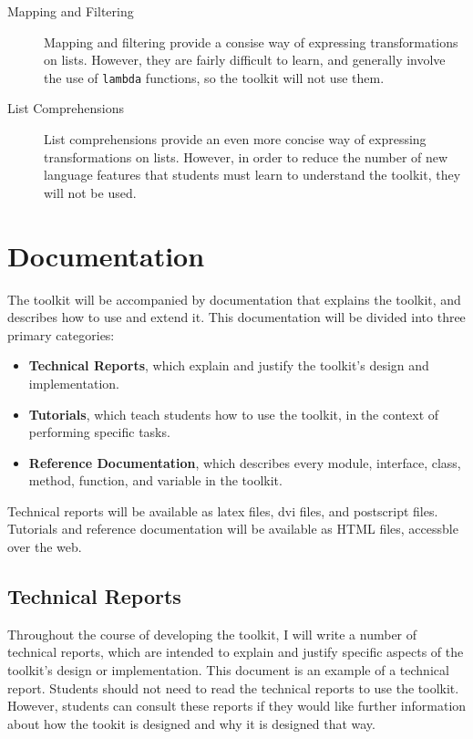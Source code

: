 \documentclass{article}
\begin{document}
\begin{description}
  \item[Mapping and Filtering] Mapping and filtering provide a
  consise way of expressing transformations on lists.  However, they
  are fairly difficult to learn, and generally involve the use of
  \texttt{lambda} functions, so the toolkit will not use them.

  \item[List Comprehensions] List comprehensions provide an even more
  concise way of expressing transformations on lists.  However, in
  order to reduce the number of new language features that students
  must learn to understand the toolkit, they will not be used.

\end{description}

\section{Documentation}

The toolkit will be accompanied by documentation that explains the
toolkit, and describes how to use and extend it.  This documentation
will be divided into three primary categories:

\begin{itemize}
  \item \textbf{Technical Reports}, which explain and justify the
  toolkit's design and implementation.

  \item \textbf{Tutorials}, which teach students how to use the
  toolkit, in the context of performing specific tasks.

  \item \textbf{Reference Documentation}, which describes every
  module, interface, class, method, function, and variable in the
  toolkit.
\end{itemize}

Technical reports will be available as latex files, dvi files, and
postscript files.  Tutorials and reference documentation will be
available as HTML files, accessble over the web.

\subsection{Technical Reports}

Throughout the course of developing the toolkit, I will write a number
of technical reports, which are intended to explain and justify
specific aspects of the toolkit's design or implementation.  This
document is an example of a technical report.  Students should not
need to read the technical reports to use the toolkit.  However,
students can consult these reports if they would like further
information about how the tookit is designed and why it is designed
that way.
\end{document}
